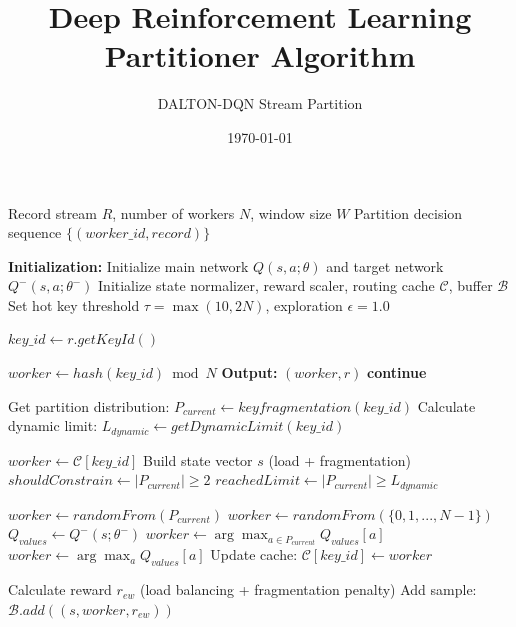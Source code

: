 \documentclass[11pt]{article}
\title{Deep Reinforcement Learning Partitioner Algorithm}
\author{DALTON-DQN Stream Partition}
\date{\today}
\begin{document}
\maketitle

\begin{algorithm}[H]
\caption{Frequency-Constrained Deep Reinforcement Learning Partitioner}
\label{alg:drl_partitioner}
\begin{algorithmic}[1]

\REQUIRE Record stream $R$, number of workers $N$, window size $W$
\ENSURE Partition decision sequence $\{(worker\_id, record)\}$

\STATE \textbf{Initialization:}
\STATE Initialize main network $Q(s,a;\theta)$ and target network $Q^-(s,a;\theta^-)$
\STATE Initialize state normalizer, reward scaler, routing cache $\mathcal{C}$, buffer $\mathcal{B}$
\STATE Set hot key threshold $\tau = \max(10, 2N)$, exploration $\epsilon = 1.0$

\STATE 
{}
    \STATE $key\_id \gets r.getKeyId()$
    
        \STATE $worker \gets hash(key\_id) \bmod N$
        \STATE \textbf{Output:} $(worker, r)$
        \STATE \textbf{continue}
    \ENDIF
    
    \STATE Get partition distribution: $P_{current} \gets keyfragmentation(key\_id)$
    \STATE Calculate dynamic limit: $L_{dynamic} \gets getDynamicLimit(key\_id)$
    
        \STATE $worker \gets \mathcal{C}[key\_id]$
    \ELSE
        \STATE Build state vector $s$ (load + fragmentation)
        \STATE $shouldConstrain \gets |P_{current}| \geq 2$
        \STATE $reachedLimit \gets |P_{current}| \geq L_{dynamic}$
        
                \STATE $worker \gets randomFrom(P_{current})$
            \ELSE
                \STATE $worker \gets randomFrom(\{0, 1, ..., N-1\})$
            \ENDIF
        \ELSE
            \STATE $Q_{values} \gets Q^-(s; \theta^-)$
                \STATE $worker \gets \arg\max_{a \in P_{current}} Q_{values}[a]$
            \ELSE
                \STATE $worker \gets \arg\max_{a} Q_{values}[a]$
            \ENDIF
        \ENDIF
        \STATE Update cache: $\mathcal{C}[key\_id] \gets worker$
    \ENDIF
    
    \STATE Calculate reward $r_{ew}$ (load balancing + fragmentation penalty)
    \STATE Add sample: $\mathcal{B}.add((s, worker, r_{ew}))$
    

\end{algorithmic}
\end{algorithm}
\end{document}
